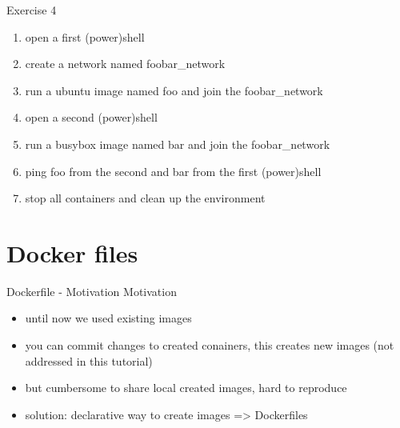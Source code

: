 \documentclass[10pt,aspectratio=\ratio,
compress
]{beamer}
\begin{document}
\begin{frame}{Exercise 4}
\begin{enumerate}
	\item open a first (power)shell
	\item create a network named foobar\_network
	\item run a ubuntu image named foo and join the foobar\_network
	\item open a second (power)shell
	\item run a busybox image named bar and join the foobar\_network
	\item ping foo from the second and bar from the first (power)shell
	\item stop all containers and clean up the environment
	
\end{enumerate}
\end{frame}


\section{Docker files}

\begin{frame}{Dockerfile - Motivation}
Motivation
\begin{itemize}
	\item until now we used existing images
	\item you can commit changes to created conainers, this creates new images (not addressed in this tutorial)
	\item but cumbersome to share local created images, hard to reproduce
	\item solution: declarative way to create images => Dockerfiles
\end{itemize}

\end{frame}
\end{document}
